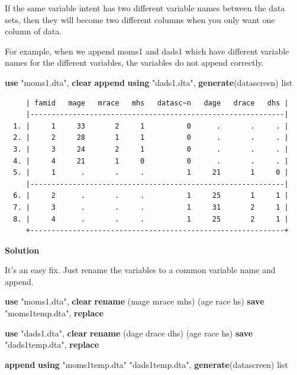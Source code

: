 \documentclass[
]{book}
\newenvironment{Shaded}{\begin{snugshade}}{\end{snugshade}}
\newcommand{\KeywordTok}[1]{\textcolor[rgb]{0.13,0.29,0.53}{\textbf{#1}}}
\newcommand{\NormalTok}[1]{#1}
\newcommand{\OtherTok}[1]{\textcolor[rgb]{0.56,0.35,0.01}{#1}}
\newcommand{\StringTok}[1]{\textcolor[rgb]{0.31,0.60,0.02}{#1}}
\begin{document}
If the same variable intent has two different variable names between the data sets, then they will become two different columns when you only want one column of data.

For example, when we append moms1 and dads1 which have different variable names for the different variables, the variables do not append correctly.

\begin{Shaded}
\begin{Highlighting}[]
\KeywordTok{use} \StringTok{"moms1.dta"}\NormalTok{, }\KeywordTok{clear}
\KeywordTok{append} \KeywordTok{using} \StringTok{"dads1.dta"}\NormalTok{, }\KeywordTok{generate}\NormalTok{(datascreen)}
\OtherTok{list}
\end{Highlighting}
\end{Shaded}

\begin{verbatim}
     | famid   mage   mrace   mhs   datasc~n   dage   drace   dhs |
     |------------------------------------------------------------|
  1. |     1     33       2     1          0      .       .     . |
  2. |     2     28       1     1          0      .       .     . |
  3. |     3     24       2     1          0      .       .     . |
  4. |     4     21       1     0          0      .       .     . |
  5. |     1      .       .     .          1     21       1     0 |
     |------------------------------------------------------------|
  6. |     2      .       .     .          1     25       1     1 |
  7. |     3      .       .     .          1     31       2     1 |
  8. |     4      .       .     .          1     25       2     1 |
     +------------------------------------------------------------+
\end{verbatim}

\textbf{Solution}

It's an easy fix. Just rename the variables to a common variable name and append.

\begin{Shaded}
\begin{Highlighting}[]
\KeywordTok{use} \StringTok{"moms1.dta"}\NormalTok{, }\KeywordTok{clear}
\KeywordTok{rename}\NormalTok{ (mage mrace mhs) (age race hs)}
\KeywordTok{save} \StringTok{"moms1temp.dta"}\NormalTok{, }\KeywordTok{replace}

\KeywordTok{use} \StringTok{"dads1.dta"}\NormalTok{, }\KeywordTok{clear}
\KeywordTok{rename}\NormalTok{ (dage drace dhs) (age race hs)}
\KeywordTok{save} \StringTok{"dads1temp.dta"}\NormalTok{, }\KeywordTok{replace}

\KeywordTok{append} \KeywordTok{using} \StringTok{"moms1temp.dta"} \StringTok{"dads1temp.dta"}\NormalTok{, }\KeywordTok{generate}\NormalTok{(datascreen)}
\OtherTok{list}
\end{Highlighting}
\end{Shaded}
\end{document}

